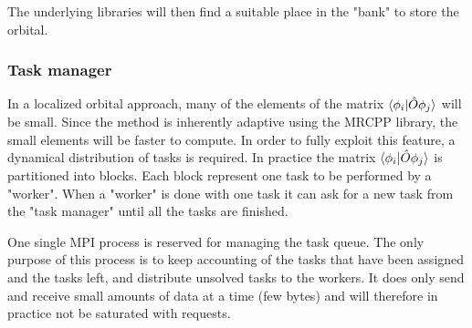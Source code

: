 \documentclass{article}
\begin{document}
The underlying libraries will then find a suitable place in the "bank" to store the orbital.


\subsubsection{Task manager} 
In a localized orbital approach, many of the elements of the matrix $\braket{\phi_i|{\hat O} \phi_j}$ will be small. Since the method is inherently adaptive using the MRCPP library, the small elements will be faster to compute. In order to fully exploit this feature, a dynamical distribution of tasks is required.  
In practice the matrix $\braket{\phi_i|{\hat O} \phi_j}$ is partitioned into blocks. Each block represent one task to be performed by a "worker". When a "worker" is done with one task it can ask for a new task from the "task manager" until all the tasks are finished.

One single MPI process is reserved for managing the task queue. The only purpose of this process is to keep accounting of the tasks that have been assigned and the tasks left, and distribute unsolved tasks to the workers. It does only send and receive small amounts of data at a time (few bytes) and will therefore in practice not be saturated with requests.



\end{document}
